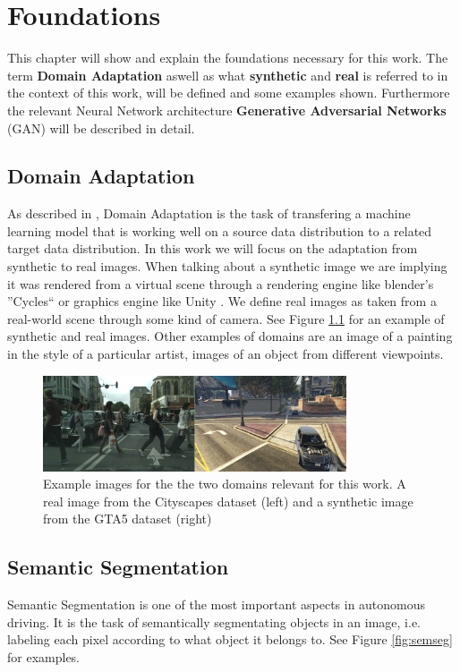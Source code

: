 \chapter{Foundations}
\label{sec:foundations}

This chapter will show and explain the foundations necessary for this work. The term \textbf{Domain Adaptation} aswell as what \textbf{synthetic} and \textbf{real} is referred to in the context of this work, will be defined and some examples shown. Furthermore the relevant Neural Network architecture \textbf{Generative Adversarial Networks} (GAN) will be described in detail.


\section{Domain Adaptation}
As described in \cite{DBLP:journals/corr/Csurka17},
Domain Adaptation is the task of transfering a machine learning model that is working well on a source data distribution to a related target data distribution. In this work we will focus on the adaptation from synthetic to real images. When talking about a synthetic image we are implying it was rendered from a virtual scene through a rendering engine like blender's ''Cycles`` \cite{Cycles} or graphics engine like Unity \cite{Unity}. We define real images as taken from a real-world scene through some kind of camera. See Figure \ref{fig:DA_examples} for an example of synthetic and real images. Other examples of domains are an image of a painting in the style of a particular artist, images of an object from different viewpoints. 

\begin{figure}
	\centering
	 \includegraphics[width=0.8\textwidth]{../images/DA_examples_cityscapes_gta.png}
	\caption{Example images for the the two domains relevant for this work. A real image from the Cityscapes dataset \cite{Cordts_2016_CVPR} (left) and a synthetic image from the GTA5 dataset \cite{Richter_2016_ECCV} (right)}
	\label{fig:DA_examples}
\end{figure}

\section{Semantic Segmentation}
Semantic Segmentation is one of the most important aspects in autonomous driving. It is the task of semantically segmentating objects in an image, i.e. labeling each pixel according to what object it belongs to. See Figure \ref{fig:semseg} for examples.

